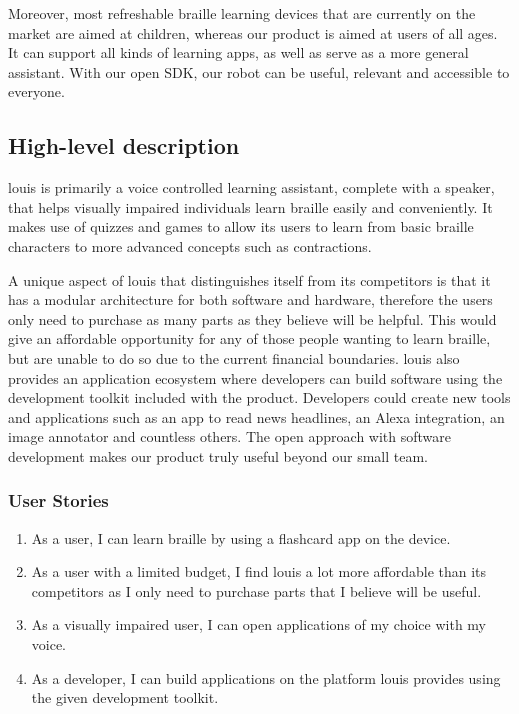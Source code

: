 \documentclass{article}
\begin{document}
Moreover, most refreshable braille learning devices that are currently on the market are aimed at children, whereas our product is aimed at users of all ages. It can support all kinds of learning apps, as well as serve as a more general assistant. With our open SDK, our robot can be useful, relevant and accessible to everyone.


\subsection{High-level description} 

louis is primarily a voice controlled learning assistant, complete with a speaker, that helps visually impaired individuals learn braille easily and conveniently. It makes use of quizzes and games to allow its users to learn from basic braille characters to more advanced concepts such as contractions.

A unique aspect of louis that distinguishes itself from its competitors is that it has a modular architecture for both software and hardware, therefore the users only need to purchase as many parts as they believe will be helpful. This would give an affordable opportunity for any of those people wanting to learn braille, but are unable to do so due to the current financial boundaries. louis also provides an application ecosystem where developers can build software using the development toolkit included with the product. Developers could create new tools and applications such as an app to read news headlines, an Alexa integration, an image annotator and countless others. The open approach with software development makes our product truly useful beyond our small team.

\subsubsection{User Stories}

\begin{enumerate}
  \item As a user, I can learn braille by using a flashcard app on the device.
  \item As a user with a limited budget, I find louis a lot more affordable than its competitors as I only need to purchase parts that I believe will be useful.
  \item As a visually impaired user, I can open applications of my choice with my voice.
  \item As a developer, I can build applications on the platform louis provides using the given development toolkit.
\end{enumerate}
\end{document}
